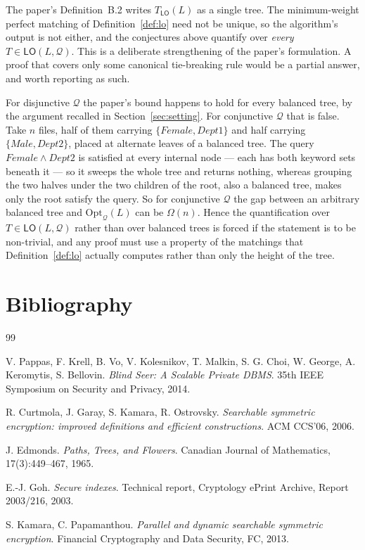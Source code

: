\documentclass{aicr-conjecture}
\newcommand{\Qd}{\mathcal{Q}}
\newcommand{\Opt}{\mathrm{Opt}}
\newcommand{\LO}{\mathsf{LO}}
\begin{document}
\begin{remark}\label{rem:ties}
The paper's Definition~B.2 writes $T_{\LO}(L)$ as a single tree. The
minimum-weight perfect matching of Definition~\ref{def:lo} need not be
unique, so the algorithm's output is not either, and the conjectures above
quantify over \emph{every} $T \in \LO(L,\Qd)$. This is a deliberate
strengthening of the paper's formulation. A proof that covers only some
canonical tie-breaking rule would be a partial answer, and worth reporting
as such.
\end{remark}

\begin{remark}\label{rem:shape}
For disjunctive $\Qd$ the paper's bound happens to hold for every balanced
tree, by the argument recalled in Section~\ref{sec:setting}. For
conjunctive $\Qd$ that is false. Take $n$ files, half of them carrying
$\{\mathit{Female},\mathit{Dept1}\}$ and half carrying
$\{\mathit{Male},\mathit{Dept2}\}$, placed at alternate leaves of a
balanced tree. The query $\mathit{Female} \wedge \mathit{Dept2}$ is
satisfied at every internal node --- each has both keyword sets beneath it
--- so it sweeps the whole tree and returns nothing, whereas grouping the
two halves under the two children of the root, also a balanced tree, makes
only the root satisfy the query. So for conjunctive $\Qd$ the gap between
an arbitrary balanced tree and $\Opt_{\Qd}(L)$ can be $\Omega(n)$. Hence
the quantification over $T \in \LO(L,\Qd)$ rather than over balanced trees
is forced if the statement is to be non-trivial, and any proof must use a
property of the matchings that Definition~\ref{def:lo} actually computes
rather than only the height of the tree.
\end{remark}

\section{Bibliography}

\begin{aicrbibliography}{99}

V. Pappas, F. Krell, B. Vo, V. Kolesnikov, T. Malkin, S. G. Choi,
W. George, A. Keromytis, S. Bellovin.
\emph{Blind Seer: A Scalable Private DBMS}.
35th IEEE Symposium on Security and Privacy, 2014.

R. Curtmola, J. Garay, S. Kamara, R. Ostrovsky.
\emph{Searchable symmetric encryption: improved definitions and efficient
constructions}.
ACM CCS'06, 2006.

J. Edmonds.
\emph{Paths, Trees, and Flowers}.
Canadian Journal of Mathematics, 17(3):449--467, 1965.

E.-J. Goh.
\emph{Secure indexes}.
Technical report, Cryptology ePrint Archive, Report 2003/216, 2003.

S. Kamara, C. Papamanthou.
\emph{Parallel and dynamic searchable symmetric encryption}.
Financial Cryptography and Data Security, FC, 2013.

\end{aicrbibliography}
\end{document}
